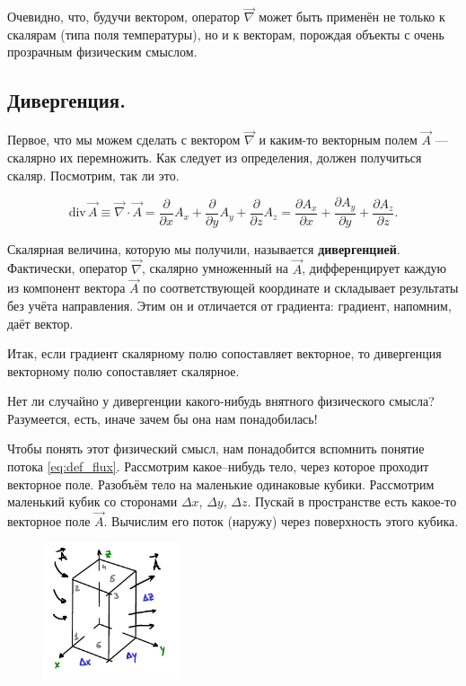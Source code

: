 \documentclass[a4paper,12pt]{article}
\numberwithin{equation}{section}
\newcommand{\pt}{\partial}
\renewcommand{\div}{\mathrm{div}\,}
\begin{document}
Очевидно, что, будучи вектором, оператор $\vec{\nabla}$ может быть применён
не только к скалярам (типа поля температуры), но и к векторам,
порождая объекты с очень прозрачным физическим смыслом. 

\subsection{Дивергенция.}
\label{sec:divergence}

Первое, что мы можем сделать с вектором $\vec{\nabla}$ и каким-то
векторным полем $\vec{A}$ --- скалярно их перемножить. Как следует из
определения, должен получиться скаляр. Посмотрим, так ли это.

\begin{equation}
  \label{eq:def_divergence}
  \div \vec{A} \equiv \vec{\nabla} \cdot \vec{A} = \frac{\pt}{\pt x}
  A_x +  \frac{\pt}{\pt y} A_y +  \frac{\pt}{\pt z} A_z = \frac{\pt
    A_x}{\pt x} +  \frac{\pt A_y}{\pt y} +  \frac{\pt A_z}{\pt z}.
\end{equation}

Скалярная величина, которую мы получили, называется
\textbf{дивергенцией}. Фактически, оператор $\vec{\nabla}$, скалярно
умноженный на $\vec{A}$, дифференцирует каждую из компонент вектора
$\vec{A}$ по соответствующей координате и складывает результаты без
учёта направления. Этим он и отличается от градиента: градиент,
напомним, даёт вектор. 

Итак, если градиент скалярному полю сопоставляет векторное, то
дивергенция векторному полю сопоставляет скалярное. 

Нет ли случайно у дивергенции какого-нибудь внятного физического
смысла? Разумеется, есть, иначе зачем бы она нам понадобилась!

Чтобы понять этот физический смысл, нам понадобится вспомнить понятие
потока \eqref{eq:def_flux}. Рассмотрим какое--нибудь тело, через
которое проходит векторное поле. Разобъём тело на маленькие одинаковые
кубики. Рассмотрим маленький кубик со сторонами $\Delta x$, $\Delta
y$, $\Delta z$. Пускай в пространстве есть какое-то векторное поле
$\vec{A}$. Вычислим его поток (наружу) через поверхность этого кубика.

\begin{figure}
  \begin{center}
    \includegraphics[width=4cm,height=4cm]{div.pdf}
  \end{center}
  \label{fig:div}
\end{figure}
\end{document}
